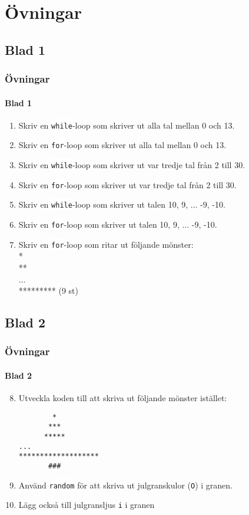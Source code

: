 \documentclass[aspectratio=169]{beamer}
\newcommand{\code}[1]{\colorbox{white}{\lstinline{#1}}}
\begin{document}
\section{Övningar}

\subsection{Blad 1}

\begin{frame}
	\frametitle{Övningar}
	\framesubtitle{Blad 1}

	\begin{enumerate}
		\item Skriv en \code{while}-loop som skriver ut alla tal mellan 0 och 13.
		\item Skriv en \code{for}-loop som skriver ut alla tal mellan 0 och 13.
		\item Skriv en \code{while}-loop som skriver ut var tredje tal från 2 till 30.
		\item Skriv en \code{for}-loop som skriver ut var tredje tal från 2 till 30.
		\item Skriv en \code{while}-loop som skriver ut talen 10, 9, ... -9, -10.
		\item Skriv en \code{for}-loop som skriver ut talen 10, 9, ... -9, -10.
		\item Skriv en \code{for}-loop som ritar ut följande mönster:\\
		*\\
		**\\
		...\\
		********* (9 st)
	\end{enumerate}

\end{frame}

\subsection{Blad 2}

\begin{frame}[fragile]
	\frametitle{Övningar}
	\framesubtitle{Blad 2}
	
	\begin{enumerate}
		\setcounter{enumi}{7}
		\item Utveckla koden till att skriva ut följande mönster istället:
		\begin{verbatim}
        *
       ***
      *****
...
*******************
       ###
		\end{verbatim}
		\item Använd \code{random} för att skriva ut julgranskulor (\code{O}) i granen.
		\item Lägg också till julgransljus \code{i} i granen
	\end{enumerate}
\end{frame}
\end{document}
